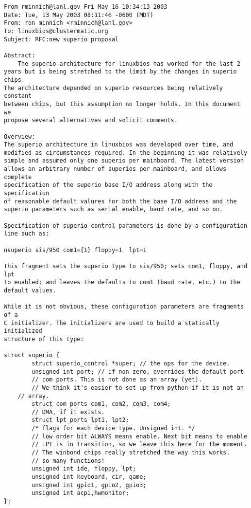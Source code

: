 \begin{verbatim}
From rminnich@lanl.gov Fri May 16 10:34:13 2003
Date: Tue, 13 May 2003 08:11:46 -0600 (MDT)
From: ron minnich <rminnich@lanl.gov>
To: linuxbios@clustermatic.org
Subject: RFC:new superio proposal

Abstract:
	The superio architecture for linuxbios has worked for the last 2
years but is being stretched to the limit by the changes in superio chips.
The architecture depended on superio resources being relatively constant
between chips, but this assumption no longer holds. In this document we
propose several alternatives and solicit comments.

Overview:
The superio architecture in linuxbios was developed over time, and
modified as circumstances required. In the beginning it was relatively
simple and assumed only one superio per mainboard. The latest version
allows an arbitrary number of superios per mainboard, and allows complete
specification of the superio base I/O address along with the specification
of reasonable default valures for both the base I/O address and the
superio parameters such as serial enable, baud rate, and so on.

Specification of superio control parameters is done by a configuration
line such as:

nsuperio sis/950 com1={1} floppy=1  lpt=1

This fragment sets the superio type to sis/950; sets com1, floppy, and lpt
to enabled; and leaves the defaults to com1 (baud rate, etc.) to the
default values.

While it is not obvious, these configuration parameters are fragments of a
C initializer. The initializers are used to build a statically initialized
structure of this type:

struct superio {
        struct superio_control *super; // the ops for the device.
        unsigned int port; // if non-zero, overrides the default port
        // com ports. This is not done as an array (yet).
        // We think it's easier to set up from python if it is not an
	// array.
        struct com_ports com1, com2, com3, com4;
        // DMA, if it exists.
        struct lpt_ports lpt1, lpt2;
        /* flags for each device type. Unsigned int. */
        // low order bit ALWAYS means enable. Next bit means to enable
        // LPT is in transition, so we leave this here for the moment.
        // The winbond chips really stretched the way this works.
        // so many functions!
        unsigned int ide, floppy, lpt;
        unsigned int keyboard, cir, game;
        unsigned int gpio1, gpio2, gpio3;
        unsigned int acpi,hwmonitor;
};


\end{verbatim}
